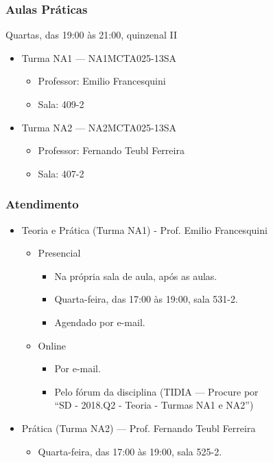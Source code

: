 \documentclass[Ligatures=TeX,table,brazil,svgnames,usetotalslideindicator,comp
ress,10pt]{beamer}
\begin{document}
\begin{frame}
  \frametitle{Aulas Práticas}
  Quartas, das 19:00 às 21:00, quinzenal II

  \begin{itemize}
  \item Turma NA1 --- NA1MCTA025-13SA
    \begin{itemize}
    \item Professor: Emilio Francesquini
    \item Sala: 409-2
    \end{itemize}
  \item Turma NA2 --- NA2MCTA025-13SA
    \begin{itemize}
    \item Professor: Fernando Teubl Ferreira
    \item Sala: 407-2
    \end{itemize}
  \end{itemize}
\end{frame}

\begin{frame}
  \frametitle{Atendimento}
  \begin{itemize}
  \item Teoria e Prática (Turma NA1) - Prof. Emilio Francesquini
    \begin{itemize}
    \item Presencial
      \begin{itemize}
      \item Na própria sala de aula, após as aulas.
      \item Quarta-feira, das 17:00 às 19:00, sala 531-2.
      \item Agendado por e-mail.
      \end{itemize}
    \item Online
      \begin{itemize}
      \item Por e-mail.
      \item Pelo fórum da disciplina (TIDIA --- Procure por \\``SD - 2018.Q2 - Teoria - Turmas NA1 e NA2'')
      \end{itemize}
    \end{itemize}
  \item Prática (Turma NA2) --- Prof. Fernando Teubl Ferreira
    \begin{itemize}
    \item Quarta-feira, das 17:00 às 19:00, sala 525-2.
    \end{itemize}
  \end{itemize}
\end{frame}
\end{document}
